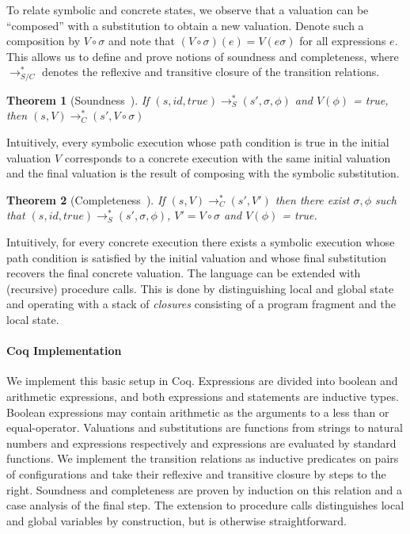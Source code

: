 \documentclass[submission,copyright,creativecommons]{eptcs}
\newtheorem{theorem}{Theorem}
\begin{document}
To relate symbolic and concrete states, we observe that a valuation can be ``composed'' with a substitution
to obtain a new valuation. Denote such a composition by $V \circ \sigma$ and note that $(V \circ \sigma)(e) = V(e\sigma)$
for all expressions $e$.
This allows us to define and prove notions of soundness and completeness, where
$\rightarrow_{S/C}^{*}$ denotes the reflexive and transitive closure of the transition relations.
\begin{theorem}[Soundness~{\cite{boer2021}}]
  If $(s, id, true) \rightarrow_{S}^{*} (s', \sigma, \phi)$ and $V(\phi)$ = true,
  then $(s, V) \rightarrow_{C}^{*} (s', V \circ \sigma)$
\end{theorem}
Intuitively, every symbolic execution whose path condition is true in the initial valuation $V$
corresponds to a concrete execution with the same initial valuation and the final valuation is
the result of composing with the symbolic substitution.
\begin{theorem}[Completeness~{\cite{boer2021}}]
  If $(s, V) \rightarrow_{C}^{*} (s', V')$ then there exist $\sigma, \phi$ such that
  $(s, id, true) \rightarrow_{S}^{*} (s', \sigma, \phi)$, $V' = V \circ \sigma$ and $V(\phi)$ = true.
\end{theorem}
Intuitively, for every concrete execution there exists a symbolic execution whose path condition
is satisfied by the initial valuation and whose final substitution recovers the final concrete valuation.
The language can be extended with (recursive) procedure calls.
This is done by distinguishing local and global state and operating with a stack of \emph{closures} consisting
of a program fragment and the local state.
\paragraph{Coq Implementation}
We implement this basic setup in Coq. Expressions are divided into boolean and arithmetic expressions,
and both expressions and statements are inductive types. Boolean expressions may contain arithmetic as the
arguments to a less than or equal-operator.
Valuations and substitutions are functions from strings to natural numbers and expressions respectively and
expressions are evaluated by standard functions.
We implement the transition relations as inductive predicates on pairs of configurations and take their
reflexive and transitive closure by steps to the right.
Soundness and completeness are proven by induction on this relation and a case analysis of the final step.
The extension to procedure calls distinguishes local and global variables by construction, but is
otherwise straightforward.
\end{document}
